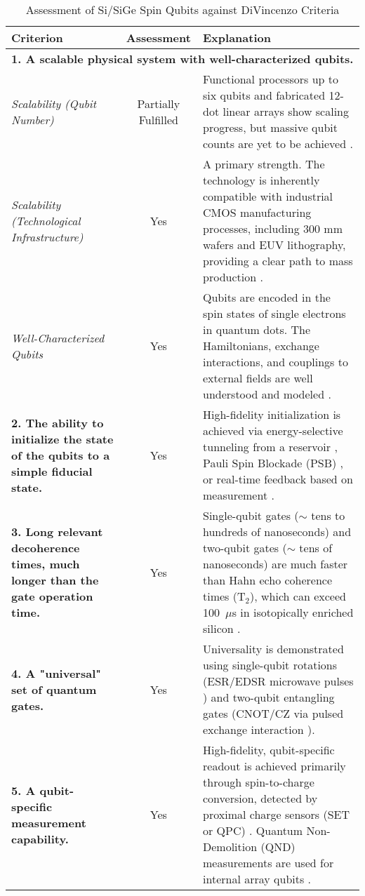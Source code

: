 \begin{table}[H]
    \centering
    \caption{Assessment of Si/SiGe Spin Qubits against DiVincenzo Criteria}
    \begin{tabular}{|p{}|c|p{}|}
        \hline
        \textbf{Criterion} & \textbf{Assessment} & \textbf{Explanation} \\
        \hline
        \multicolumn{3}{|l|}{\textbf{1. A scalable physical system with well-characterized qubits.}} \\
        \hline
        \hspace{5mm} \emph{Scalability (Qubit Number)} & Partially Fulfilled & Functional processors up to six qubits \cite{ref11} and fabricated 12-dot linear arrays \cite{ref10} show scaling progress, but massive qubit counts are yet to be achieved \cite{ref2, ref9}. \\
        \hline
        \hspace{5mm} \emph{Scalability (Technological Infrastructure)} & Yes & A primary strength. The technology is inherently compatible with industrial CMOS manufacturing processes, including 300 mm wafers and EUV lithography, providing a clear path to mass production \cite{ref2, ref5, ref7, ref10}. \\
        \hline
        \hspace{5mm} \emph{Well-Characterized Qubits} & Yes & Qubits are encoded in the spin states of single electrons in quantum dots. The Hamiltonians, exchange interactions, and couplings to external fields are well understood and modeled \cite{ref9, ref12}. \\
        \hline
        \textbf{2. The ability to initialize the state of the qubits to a simple fiducial state.} & Yes & High-fidelity initialization is achieved via energy-selective tunneling from a reservoir \cite{ref9}, Pauli Spin Blockade (PSB) \cite{ref2, ref9}, or real-time feedback based on measurement \cite{ref11}. \\
        \hline
        \textbf{3. Long relevant decoherence times, much longer than the gate operation time.} & Yes & Single-qubit gates ($\sim$ tens to hundreds of nanoseconds) and two-qubit gates ($\sim$ tens of nanoseconds) \cite{ref9, ref11} are much faster than Hahn echo coherence times (T$_2$), which can exceed 100~$\mu$s in isotopically enriched silicon \cite{ref4, ref9}. \\
        \hline
        \textbf{4. A "universal" set of quantum gates.} & Yes & Universality is demonstrated using single-qubit rotations (ESR/EDSR microwave pulses \cite{ref2, ref9}) and two-qubit entangling gates (CNOT/CZ via pulsed exchange interaction \cite{ref1, ref2, ref9}). \\
        \hline
        \textbf{5. A qubit-specific measurement capability.} & Yes & High-fidelity, qubit-specific readout is achieved primarily through spin-to-charge conversion, detected by proximal charge sensors (SET or QPC) \cite{ref2, ref9}. Quantum Non-Demolition (QND) measurements are used for internal array qubits \cite{ref11}. \\
        \hline
    \end{tabular}
\end{table}


